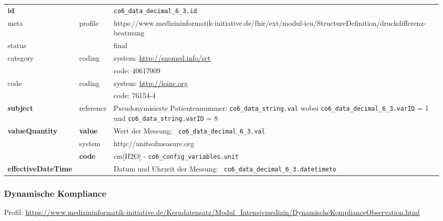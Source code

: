 \begin{longtable}{|l|l|p{7.5cm}|}
        \hline
        \rowcolor{lightgray} \multicolumn{3}{|l|}{Data Mapping (inhaltlich)} \\ \hline
        \textbf{id} &  & \texttt{co6\_data\_decimal\_6\_3.id} \\ \hline
	meta & profile & https://www.medizininformatik-initiative.de/fhir/ext/modul-icu/StructureDefinition/druckdifferenz-beatmung \\ \hline 
	status &  & final   \\ \hline 
	category & coding & system: \url{http://snomed.info/sct} \\
\cline{3-3}
	& & code: 40617009 \\ \hline
	code & coding & system: \url{http://loinc.org} \\ 
	\cline{3-3} 
	 &  & code: 76154-4 \\ \hline
	 \textbf{subject} & reference & Pseudonymisierte Patientennummer: \texttt{co6\_data\_string.val} wobei \texttt{co6\_data\_decimal\_6\_3.varID} = 1 und \texttt{co6\_data\_string.varID} = 8 \\ \hline
	 \textbf{valueQuantity}  & \textbf{value} & Wert der Messung: \texttt{
co6\_data\_decimal\_6\_3.val} \\
        \cline{2-3}
         & system & http://unitsofmeasure.org \\
         \cline{2-3}
         & \textbf{code} &
cm[H2O] - \texttt{co6\_config\_variables.unit}
\\ \hline
     \textbf{effectiveDateTime}  & & Datum und Uhrzeit der Messung: \texttt{
co6\_data\_decimal\_6\_3.datetimeto} \\ \hline
\end{longtable}

\subsubsection{Dynamische Kompliance} 

Profil: \url{https://www.medizininformatik-initiative.de/Kerndatensatz/Modul_Intensivmedizin/DynamischeKomplianceObservation.html}

\clearpage

